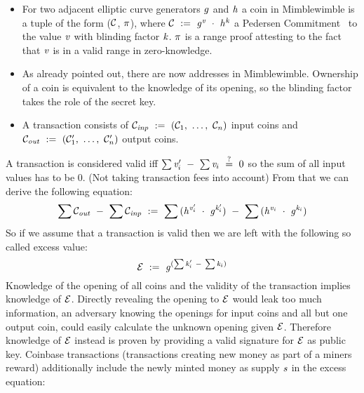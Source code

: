 \begin{itemize}
    \item For two adjacent elliptic curve generators $\mathit{g}$ and $\mathit{h}$ a coin in Mimblewimble is a tuple of the form ($\mathcal{C}$, $\pi$), where $\mathcal{C} ~:=~ \mathit{g}^{\mathit{v}} ~\cdot~ \mathit{h}^{\mathit{k}}$  a Pedersen Commitment~\cite{pedersen1991non}
    to the value $\mathit{v}$ with blinding factor $\mathit{k}$. $\pi$ is a range proof attesting to the fact that $\mathit{v}$ is in a valid range  in zero-knowledge.
    
    \item As already pointed out, there are now addresses in Mimblewimble. Ownership of a coin is equivalent to the knowledge of its opening, so the blinding factor takes the role of the secret key.
    
    \item A transaction consists of $\mathcal{C}_{\mathit{inp}} ~:=~ (\mathcal{C}_1 ,~ \dots ,~ \mathcal{C}_n)$ input coins and $\mathcal{C}_{\mathit{out}} ~:=~ (\mathcal{C}'_1 ,~ \dots ,~ \mathcal{C}'_n)$ output coins.
\end{itemize}
A transaction is considered valid iff $\sum{\mathit{v}'_i} ~-~ \sum{\mathit{v}_i} ~\stackrel{?}{=}~ 0$ so the sum of all input values has to be 0. (Not taking transaction fees into account) 
From that we can derive the following equation:
\[ \sum{\mathcal{C}_{\mathit{out}}} ~-~ \sum{\mathcal{C}_{\mathit{inp}}} ~:=~ \sum{(\mathit{h}^{\mathit{v}'_i} ~\cdot~\mathit{g}^{\mathit{k}'_i})} ~-~ \sum{(\mathit{h}^{\mathit{v}_i} ~\cdot~\mathit{g}^{\mathit{k}_i})} \]
So if we assume that a transaction is valid then we are left with the following so called excess value:
\[ \mathcal{E} ~:=~ \mathit{g}^{(\sum{\mathit{k}'_i} ~-~ \sum{\mathit{k}_i})} \]
Knowledge of the opening of all coins and the validity of the transaction implies knowledge of $\mathcal{E}$.  
Directly revealing the opening to $\mathcal{E}$ would leak too much information, an adversary knowing the openings for input coins and all but one output coin, could easily calculate the unknown opening given $\mathcal{E}$.
Therefore knowledge of $\mathcal{E}$ instead is proven by providing a valid signature for $\mathcal{E}$ as public key.
Coinbase transactions (transactions creating new money as part of a miners reward) additionally include the newly minted money as supply $\mathit{s}$ in the excess equation:
